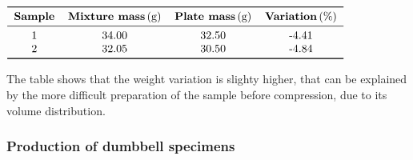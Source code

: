 \documentclass[a4paper, 11pt]{article}
\begin{document}
\begin{table}[htp]
	\centering
	$
	\begin{tabular}{cccc}
	\toprule
	\textbf{Sample} & \textbf{Mixture mass}\,\text{(g)} & \textbf{Plate mass}\,\text{(g)} & \textbf{Variation}\,\text{(\%)} \\
	\midrule
	1 & 34.00 & 32.50 & -4.41\\
	2 & 32.05 & 30.50 & -4.84\\
	\bottomrule
	\end{tabular}
	$
	\caption{Mass of the samples before and after pressing.}
	\label{tab:weights_comparison}
\end{table}

The table shows that the weight variation is slighty higher, that can be explained by the more difficult preparation of the sample before compression, due to its volume distribution.

\newpage

\subsubsection{Production of dumbbell specimens}
\end{document}
